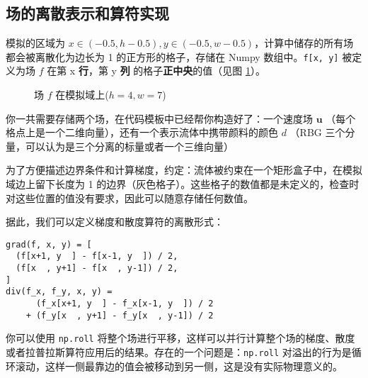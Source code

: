 \documentclass{ctexart}
\begin{document}
\subsection{场的离散表示和算符实现}

模拟的区域为 $x \in (-0.5, h-0.5), y \in (-0.5, w-0.5)$，计算中储存的所有场都会被离散化为边长为 1 的正方形的格子，存储在 Numpy 数组中。\texttt{f[x, y]} 被定义为场 $f$ 在第 x \textbf{行}，第 y \textbf{列} 的格子\textbf{正中央}的值（见图 \ref{fig:grid}）。

\begin{figure}[h!]
  \label{fig:grid}
  \centering

  \caption{场 $f$ 在模拟域上($h = 4, w = 7$)}
\end{figure}

你一共需要存储两个场，在代码模板中已经帮你构造好了：一个速度场 $\mathbf{u}$ （每个格点上是一个二维向量），还有一个表示流体中携带颜料的颜色 $d$ （RBG 三个分量，可以认为是三个分离的标量或者一个三维向量）

为了方便描述边界条件和计算梯度，约定：流体被约束在一个矩形盒子中，在模拟域边上留下长度为 1 的边界（灰色格子）。这些格子的数值都是未定义的，检查时对这些位置的值没有要求，因此可以随意存储任何数值。

据此，我们可以定义梯度和散度算符的离散形式：

\begin{verbatim}
grad(f, x, y) = [
  (f[x+1, y  ] - f[x-1, y  ]) / 2,
  (f[x  , y+1] - f[x  , y-1]) / 2,
]
div(f_x, f_y, x, y) =
      (f_x[x+1, y  ] - f_x[x-1, y  ]) / 2
    + (f_y[x  , y+1] - f_y[x  , y-1]) / 2
\end{verbatim}

你可以使用 \texttt{np.roll} 将整个场进行平移，这样可以并行计算整个场的梯度、散度或者拉普拉斯算符应用后的结果。存在的一个问题是：\texttt{np.roll} 对溢出的行为是循环滚动，这样一侧最靠边的值会被移动到另一侧，这是没有实际物理意义的。
\end{document}
